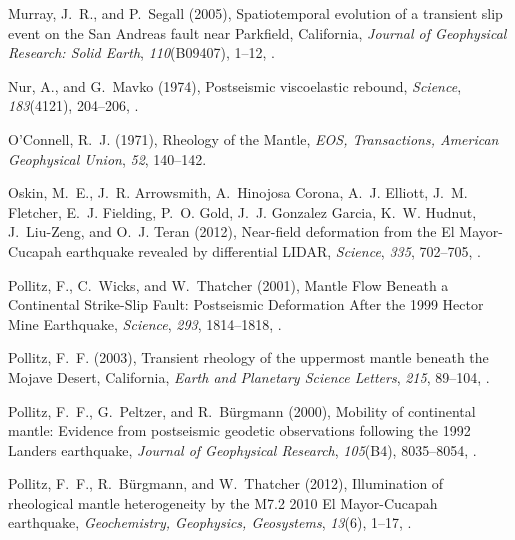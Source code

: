\documentclass[draft,linenumbers]{AGUJournal}
\begin{document}
\begin{thebibliography}{52}
Murray, J.~R., and P.~Segall (2005), {Spatiotemporal evolution of a transient slip event on the San Andreas fault near Parkfield, California}, \textit{Journal of Geophysical Research: Solid Earth}, \textit{110}(B09407), 1--12, .

Nur, A., and G.~Mavko (1974), {Postseismic viscoelastic rebound}, \textit{Science}, \textit{183}(4121), 204--206, .

O'Connell, R.~J. (1971), {Rheology of the Mantle}, \textit{EOS, Transactions, American Geophysical Union}, \textit{52}, 140--142.

Oskin, M.~E., J.~R. Arrowsmith, A.~{Hinojosa Corona}, A.~J. Elliott, J.~M. Fletcher, E.~J. Fielding, P.~O. Gold, J.~J. {Gonzalez Garcia}, K.~W. Hudnut, J.~Liu-Zeng, and O.~J. Teran (2012), {Near-field deformation from the El Mayor-Cucapah earthquake revealed by differential LIDAR}, \textit{Science}, \textit{335}, 702--705, .

Pollitz, F., C.~Wicks, and W.~Thatcher (2001), {Mantle Flow Beneath a Continental Strike-Slip Fault: Postseismic Deformation After the 1999 Hector Mine Earthquake}, \textit{Science}, \textit{293}, 1814--1818, .

Pollitz, F.~F. (2003), {Transient rheology of the uppermost mantle beneath the Mojave Desert, California}, \textit{Earth and Planetary Science Letters}, \textit{215}, 89--104, .

Pollitz, F.~F., G.~Peltzer, and R.~B{\"{u}}rgmann (2000), {Mobility of continental mantle: Evidence from postseismic geodetic observations following the 1992 Landers earthquake}, \textit{Journal of Geophysical Research}, \textit{105}(B4), 8035--8054, .

Pollitz, F.~F., R.~B{\"{u}}rgmann, and W.~Thatcher (2012), {Illumination of rheological mantle heterogeneity by the M7.2 2010 El Mayor-Cucapah earthquake}, \textit{Geochemistry, Geophysics, Geosystems}, \textit{13}(6), 1--17, .


\end{thebibliography}
\end{document}

